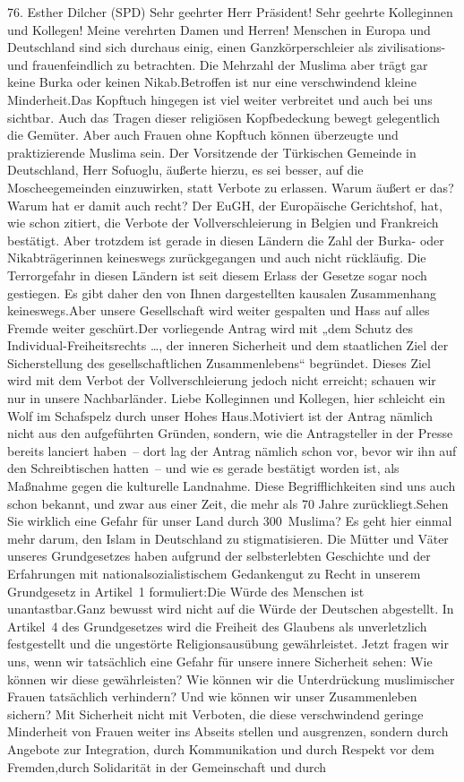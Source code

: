 \documentclass{article}
\begin{document}
	76. Esther Dilcher (SPD) Sehr geehrter Herr Präsident! Sehr geehrte Kolleginnen und Kollegen! Meine verehrten Damen und Herren! Menschen in Europa und Deutschland sind sich durchaus einig, einen Ganzkörperschleier als zivilisations- und frauenfeindlich zu betrachten. Die Mehrzahl der Muslima aber trägt gar keine Burka oder keinen Nikab.Betroffen ist nur eine verschwindend kleine Minderheit.Das Kopftuch hingegen ist viel weiter verbreitet und auch bei uns sichtbar. Auch das Tragen dieser religiösen Kopfbedeckung bewegt gelegentlich die Gemüter. Aber auch Frauen ohne Kopftuch können überzeugte und praktizierende Muslima sein. Der Vorsitzende der Türkischen Gemeinde in Deutschland, Herr Sofuoglu, äußerte hierzu, es sei besser, auf die Moscheegemeinden einzuwirken, statt Verbote zu erlassen. Warum äußert er das? Warum hat er damit auch recht? Der EuGH, der Europäische Gerichtshof, hat, wie schon zitiert, die Verbote der Vollverschleierung in Belgien und Frankreich bestätigt. Aber trotzdem ist gerade in diesen Ländern die Zahl der Burka- oder Nikabträgerinnen keineswegs zurückgegangen und auch nicht rückläufig. Die Terrorgefahr in diesen Ländern ist seit diesem Erlass der Gesetze sogar noch gestiegen. Es gibt daher den von Ihnen dargestellten kausalen Zusammenhang keineswegs.Aber unsere Gesellschaft wird weiter gespalten und Hass auf alles Fremde weiter geschürt.Der vorliegende Antrag wird mit „dem Schutz des Individual-Freiheitsrechts …, der inneren Sicherheit und dem staatlichen Ziel der Sicherstellung des gesellschaftlichen Zusammenlebens“ begründet. Dieses Ziel wird mit dem Verbot der Vollverschleierung jedoch nicht erreicht; schauen wir nur in unsere Nachbarländer. Liebe Kolleginnen und Kollegen, hier schleicht ein Wolf im Schafspelz durch unser Hohes Haus.Motiviert ist der Antrag nämlich nicht aus den aufgeführten Gründen, sondern, wie die Antragsteller in der Presse bereits lanciert haben – dort lag der Antrag nämlich schon vor, bevor wir ihn auf den Schreibtischen hatten – und wie es gerade bestätigt worden ist, als Maßnahme gegen die kulturelle Landnahme. Diese Begrifflichkeiten sind uns auch schon bekannt, und zwar aus einer Zeit, die mehr als 70 Jahre zurückliegt.Sehen Sie wirklich eine Gefahr für unser Land durch 300 Muslima? Es geht hier einmal mehr darum, den Islam in Deutschland zu stigmatisieren. Die Mütter und Väter unseres Grundgesetzes haben aufgrund der selbsterlebten Geschichte und der Erfahrungen mit nationalsozialistischem Gedankengut zu Recht in unserem Grundgesetz in Artikel 1 formuliert:Die Würde des Menschen ist unantastbar.Ganz bewusst wird nicht auf die Würde der Deutschen abgestellt. In Artikel 4 des Grundgesetzes wird die Freiheit des Glaubens als unverletzlich festgestellt und die ungestörte Religionsausübung gewährleistet. Jetzt fragen wir uns, wenn wir tatsächlich eine Gefahr für unsere innere Sicherheit sehen: Wie können wir diese gewährleisten? Wie können wir die Unterdrückung muslimischer Frauen tatsächlich verhindern? Und wie können wir unser Zusammenleben sichern? Mit Sicherheit nicht mit Verboten, die diese verschwindend geringe Minderheit von Frauen weiter ins Abseits stellen und ausgrenzen, sondern durch Angebote zur Integration, durch Kommunikation und durch Respekt vor dem Fremden,durch Solidarität in der Gemeinschaft und durch 
\end{document}

